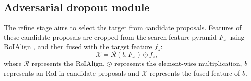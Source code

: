 \subsection{Adversarial dropout module}
\label{sec:stage2}
The refine stage aims to select the target from candidate proposals.
Features of these candidate proposals are cropped from the search feature pyramid $F_{x}$ using RoIAlign \cite{he2017mask}, and then fused with the target feature $f_{z}$:
\begin{equation}
    \mathcal{X} = \mathcal{R}(b, F_{x}) \odot f_{z},
\end{equation}
where $\mathcal{R}$ represents the RoIAlign, $\odot$ represents the element-wise multiplication, $b$ represents an RoI in candidate proposals and $\mathcal{X}$ represents the fused feature of $b$.

